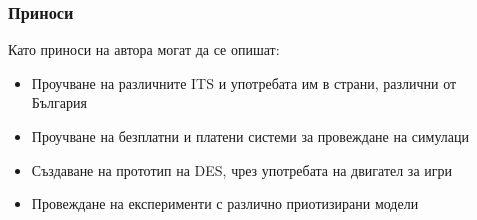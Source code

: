 \subsubsection{Приноси}
	
	Като приноси на автора могат да се опишат:
	\begin{itemize}
		\item Проучване на различните \ac{ITS} и употребата им в страни, различни от България
		\item Проучване на безплатни и платени системи за провеждане на симулаци
		\item Създаване на прототип на \ac{DES}, чрез употребата на двигател за игри
		\item Провеждане на експерименти с различно приотизирани модели		
	\end{itemize}